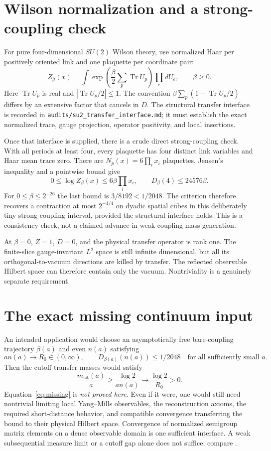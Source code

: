 \documentclass[11pt]{article}
\theoremstyle{definition}
\theoremstyle{remark}
\newcommand{\Tr}{\operatorname{Tr}}
\begin{document}
\section{Wilson normalization and a strong-coupling check}\label{sec:wilson}
For pure four-dimensional $SU(2)$ Wilson theory, use normalized Haar per
positively oriented link and one plaquette per coordinate pair:
\begin{equation}
 Z_\beta(x)=\int\exp\left(\frac\beta2\sum_p\Tr U_p\right)
                 \prod_e dU_e,\qquad\beta\ge0.\label{eq:Wilson}
\end{equation}
Here $\Tr U_p$ is real and $|\Tr U_p/2|\le1$.
The convention $\beta\sum_p(1-\Tr U_p/2)$ differs by an extensive factor
that cancels in $D$. The structural transfer interface is recorded in
\texttt{audits/su2\_transfer\_interface.md}; it must establish the exact
normalized trace, gauge projection, operator positivity, and local insertions.

Once that interface is supplied, there is a crude direct strong-coupling
check. With all periods at least four, every plaquette has four distinct
link variables and Haar mean trace zero. There are
$N_p(x)=6\prod_i x_i$ plaquettes. Jensen's inequality and a pointwise bound give
\[
 0\le\log Z_\beta(x)\le6\beta\prod_i x_i,
 \qquad D_\beta(4)\le24576\beta.\label{eq:strong}
\]
For $0\le\beta\le2^{-26}$ the last bound is $3/8192<1/2048$.
The criterion therefore recovers a contraction at most $2^{-1/4}$ on
dyadic spatial cubes in this deliberately tiny strong-coupling interval,
provided the structural interface holds. This is a consistency check,
not a claimed advance in weak-coupling mass generation.

At $\beta=0$, $Z=1$, $D=0$, and the physical transfer operator is rank one.
The finite-slice gauge-invariant $L^2$ space is still infinite dimensional,
but all its orthogonal-to-vacuum directions are killed by transfer. The
reflected observable Hilbert space can therefore contain only the vacuum.
Nontriviality is a genuinely separate requirement.

\section{The exact missing continuum input}
An intended application would choose an asymptotically free bare-coupling
trajectory $\beta(a)$ and even $n(a)$ satisfying
\begin{equation}
 an(a)\to R_0\in(0,\infty),\qquad
 D_{\beta(a)}(n(a))\le1/2048
 \quad\text{for all sufficiently small }a.\label{eq:missing}
\end{equation}
Then the cutoff transfer masses would satisfy
\[
 \frac{m_{\mathrm{lat}}(a)}a\ge\frac{\log2}{an(a)}
 \longrightarrow\frac{\log2}{R_0}>0.
\]
Equation~\eqref{eq:missing} is \emph{not proved here}. Even if it were,
one would still need nontrivial limiting local Yang--Mills observables,
the reconstruction axioms, the required short-distance behavior, and
compatible convergence transferring the bound to their physical Hilbert
space. Convergence of normalized semigroup matrix elements on a dense
observable domain is one sufficient interface. A weak subsequential
measure limit or a cutoff gap alone does not suffice; compare \cite{clay}.
\end{document}
